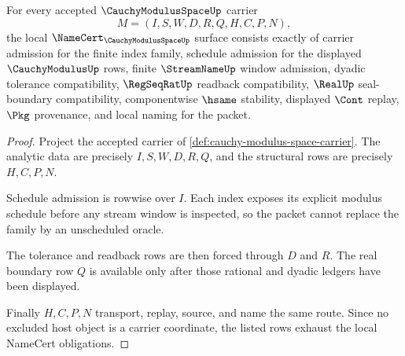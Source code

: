 \begin{theorem}
\label{thm:cauchy-modulus-space-namecert-obligations}
For every accepted $\CauchyModulusSpaceUp$ carrier
$$
M=(I,S,W,D,R,Q,H,C,P,N),
$$
the local $\NameCert_{\CauchyModulusSpaceUp}$ surface consists exactly of
carrier admission for the finite index family, schedule admission for the
displayed $\CauchyModulusUp$ rows, finite $\StreamNameUp$ window admission,
dyadic tolerance compatibility, $\RegSeqRatUp$ readback compatibility,
$\RealUp$ seal-boundary compatibility, componentwise $\hsame$ stability,
displayed $\Cont$ replay, $\Pkg$ provenance, and local naming for the packet.
\end{theorem}
\begin{proof}
Project the accepted carrier of
\autoref{def:cauchy-modulus-space-carrier}. The analytic data are precisely
$I,S,W,D,R,Q$, and the structural rows are precisely $H,C,P,N$.

Schedule admission is rowwise over $I$. Each index exposes its explicit modulus
schedule before any stream window is inspected, so the packet cannot replace the
family by an unscheduled oracle.

The tolerance and readback rows are then forced through $D$ and $R$. The real
boundary row $Q$ is available only after those rational and dyadic ledgers have
been displayed.

Finally $H,C,P,N$ transport, replay, source, and name the same route. Since no
excluded host object is a carrier coordinate, the listed rows exhaust the local
NameCert obligations.
\end{proof}

